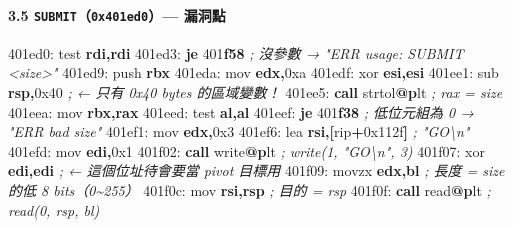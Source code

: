 \documentclass[10pt,a4paper]{article}
\newenvironment{Shaded}{\begin{snugshade}}{\end{snugshade}}
\newcommand{\BaseNTok}[1]{\textcolor[rgb]{0.00,0.00,0.81}{#1}}
\newcommand{\BuiltInTok}[1]{#1}
\newcommand{\CommentTok}[1]{\textcolor[rgb]{0.56,0.35,0.01}{\textit{#1}}}
\newcommand{\ControlFlowTok}[1]{\textcolor[rgb]{0.13,0.29,0.53}{\textbf{#1}}}
\newcommand{\DecValTok}[1]{\textcolor[rgb]{0.00,0.00,0.81}{#1}}
\newcommand{\ErrorTok}[1]{\textcolor[rgb]{0.64,0.00,0.00}{\textbf{#1}}}
\newcommand{\FunctionTok}[1]{\textcolor[rgb]{0.13,0.29,0.53}{\textbf{#1}}}
\newcommand{\KeywordTok}[1]{\textcolor[rgb]{0.13,0.29,0.53}{\textbf{#1}}}
\newcommand{\NormalTok}[1]{#1}
\newcommand{\OperatorTok}[1]{\textcolor[rgb]{0.81,0.36,0.00}{\textbf{#1}}}
\renewenvironment{Shaded}{%
  \def\FrameCommand{\fboxsep=3.2pt\colorbox{shadecolor}}%
  \MakeFramed{\advance\hsize-\width\FrameRestore\small}%
}{%
  \endMakeFramed
}
\begin{document}
\paragraph{\texorpdfstring{3.5 \texttt{SUBMIT}（\texttt{0x401ed0}）---
漏洞點}{3.5 SUBMIT（0x401ed0）--- 漏洞點}}\label{submit0x401ed0-ux6f0fux6d1eux9ede}

\begin{Shaded}
\begin{Highlighting}[]
\NormalTok{401ed0:  }\BuiltInTok{test} \KeywordTok{rdi}\OperatorTok{,}\KeywordTok{rdi}
\NormalTok{401ed3:  }\ControlFlowTok{je}   \DecValTok{401}\ErrorTok{f58}                 \CommentTok{; 沒參數 → "ERR usage: SUBMIT \textless{}size\textgreater{}"}
\NormalTok{401ed9:  }\BuiltInTok{push} \KeywordTok{rbx}
\NormalTok{401eda:  }\BuiltInTok{mov}  \KeywordTok{edx}\OperatorTok{,}\BaseNTok{0xa}
\NormalTok{401edf:  }\BuiltInTok{xor}  \KeywordTok{esi}\OperatorTok{,}\KeywordTok{esi}
\NormalTok{401ee1:  }\BuiltInTok{sub}  \KeywordTok{rsp}\OperatorTok{,}\BaseNTok{0x40}               \CommentTok{; ← 只有 0x40 bytes 的區域變數！}
\NormalTok{401ee5:  }\ControlFlowTok{call}\NormalTok{ strtol}\FunctionTok{@}\ErrorTok{p}\NormalTok{lt             }\CommentTok{; rax = size}
\NormalTok{401eea:  }\BuiltInTok{mov}  \KeywordTok{rbx}\OperatorTok{,}\KeywordTok{rax}
\NormalTok{401eed:  }\BuiltInTok{test} \KeywordTok{al}\OperatorTok{,}\KeywordTok{al}
\NormalTok{401eef:  }\ControlFlowTok{je}   \DecValTok{401}\ErrorTok{f38}                 \CommentTok{; 低位元組為 0 → "ERR bad size"}
\NormalTok{401ef1:  }\BuiltInTok{mov}  \KeywordTok{edx}\OperatorTok{,}\BaseNTok{0x3}
\NormalTok{401ef6:  }\BuiltInTok{lea}  \KeywordTok{rsi}\OperatorTok{,[}\NormalTok{rip}\OperatorTok{+}\BaseNTok{0x112f}\OperatorTok{]}       \CommentTok{; "GO\textbackslash{}n"}
\NormalTok{401efd:  }\BuiltInTok{mov}  \KeywordTok{edi}\OperatorTok{,}\BaseNTok{0x1}
\NormalTok{401f02:  }\ControlFlowTok{call}\NormalTok{ write}\FunctionTok{@}\ErrorTok{p}\NormalTok{lt              }\CommentTok{; write(1, "GO\textbackslash{}n", 3)}
\NormalTok{401f07:  }\BuiltInTok{xor}  \KeywordTok{edi}\OperatorTok{,}\KeywordTok{edi}                \CommentTok{; ← 這個位址待會要當 pivot 目標用}
\NormalTok{401f09:  }\BuiltInTok{movzx} \KeywordTok{edx}\OperatorTok{,}\KeywordTok{bl}                \CommentTok{; 長度 = size 的低 8 bits（0\textasciitilde{}255）}
\NormalTok{401f0c:  }\BuiltInTok{mov}  \KeywordTok{rsi}\OperatorTok{,}\KeywordTok{rsp}                \CommentTok{; 目的 = rsp}
\NormalTok{401f0f:  }\ControlFlowTok{call}\NormalTok{ read}\FunctionTok{@}\ErrorTok{p}\NormalTok{lt               }\CommentTok{; read(0, rsp, bl)}

\end{Highlighting}
\end{Shaded}
\end{document}
